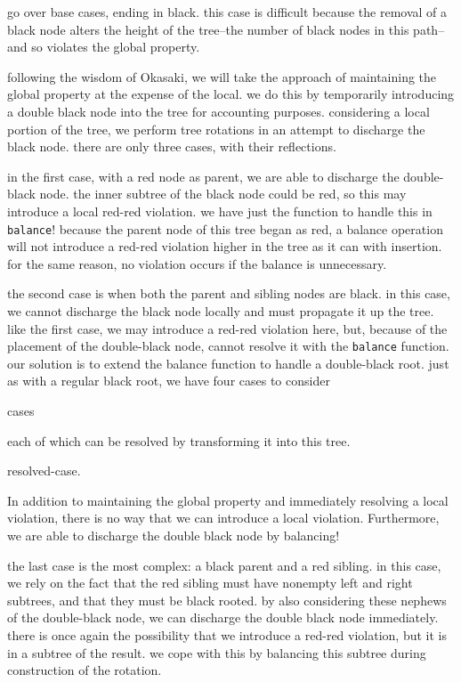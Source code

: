 \documentclass[preprint]{sigplanconf}
\begin{document}
go over base cases, ending in black. this case is difficult because the removal of a black node alters the height of the tree--the number of black nodes in this path--and so violates the global property.

following the wisdom of Okasaki, we will take the approach of maintaining the global property at the expense of the local. we do this by temporarily introducing a double black node into the tree for accounting purposes. considering a local portion of the tree, we perform tree rotations in an attempt to discharge the black node. there are only three cases, with their reflections.

in the first case, with a red node as parent, we are able to discharge the double-black node. the inner subtree of the black node could be red, so this may introduce a local red-red violation. we have just the function to handle this in \texttt{balance}! because the parent node of this tree began as red, a balance operation will not introduce a red-red violation higher in the tree as it can with insertion. for the same reason, no violation occurs if the balance is unnecessary.

the second case is when both the parent and sibling nodes are black. in this case, we cannot discharge the black node locally and must propagate it up the tree. like the first case, we may introduce a red-red violation here, but, because of the placement of the double-black node, cannot resolve it with the \texttt{balance} function. our solution is to extend the balance function to handle a double-black root. just as with a regular black root, we have four cases to consider

cases

each of which can be resolved by transforming it into this tree.

resolved-case.

In addition to maintaining the global property and immediately resolving a local violation, there is no way that we can introduce a local violation. Furthermore, we are able to discharge the double black node by balancing!

the last case is the most complex: a black parent and a red sibling. in this case, we rely on the fact that the red sibling must have nonempty left and right subtrees, and that they must be black rooted. by also considering these nephews of the double-black node, we can discharge the double black node immediately. there is once again the possibility that we introduce a red-red violation, but it is in a subtree of the result. we cope with this by balancing this subtree during construction of the rotation.
\end{document}
